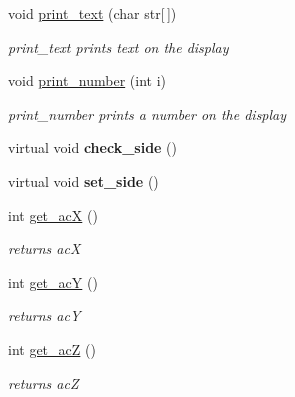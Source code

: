 \begin{DoxyCompactItemize}
void \hyperlink{classgyro__dice_afe35725bea57da1a491da5c159fbe201}{print\+\_\+text} (char str\mbox{[}$\,$\mbox{]})
\begin{DoxyCompactList}\small\item\em print\+\_\+text prints text on the display \end{DoxyCompactList}\item 
\mbox{\label{classgyro__dice_a1a6a9e55abb9dad13e516fcd6a6bf7c7}} 
void \hyperlink{classgyro__dice_a1a6a9e55abb9dad13e516fcd6a6bf7c7}{print\+\_\+number} (int i)
\begin{DoxyCompactList}\small\item\em print\+\_\+number prints a number on the display \end{DoxyCompactList}\item 
\mbox{\label{classgyro__dice_a6857792a29d9b9ad58ab37e0ccbcf2d3}} 
virtual void {\bfseries check\+\_\+side} ()
\item 
\mbox{\label{classgyro__dice_a267214c19a7631e8232d9597d9ae1729}} 
virtual void {\bfseries set\+\_\+side} ()
\item 
\mbox{\label{classgyro__dice_a73b09feb6858574531229a47d3daf84e}} 
int \hyperlink{classgyro__dice_a73b09feb6858574531229a47d3daf84e}{get\+\_\+acX} ()
\begin{DoxyCompactList}\small\item\em returns acX \end{DoxyCompactList}\item 
\mbox{\label{classgyro__dice_aba559b007667feb5887f60881d5bb017}} 
int \hyperlink{classgyro__dice_aba559b007667feb5887f60881d5bb017}{get\+\_\+acY} ()
\begin{DoxyCompactList}\small\item\em returns acY \end{DoxyCompactList}\item 
\mbox{\label{classgyro__dice_a8ae424342f37376151625dfd47804db6}} 
int \hyperlink{classgyro__dice_a8ae424342f37376151625dfd47804db6}{get\+\_\+acZ} ()
\begin{DoxyCompactList}\small\item\em returns acZ \end{DoxyCompactList}\end{DoxyCompactItemize}


